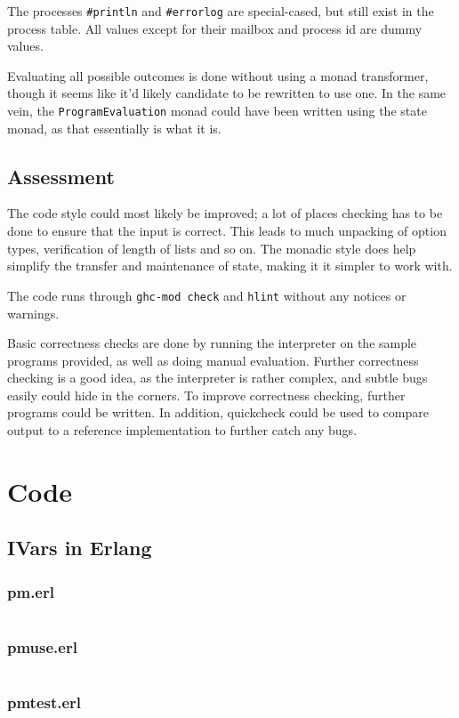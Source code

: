 \documentclass[11pt,a4paper]{article}
\begin{document}
The processes \texttt{\#println} and \texttt{\#errorlog} are special-cased,
but still exist in the process table. All values except for their mailbox and
process id are dummy values.

Evaluating all possible outcomes is done without using a monad transformer,
though it seems like it'd likely candidate to be rewritten to use one. In the
same vein, the \texttt{ProgramEvaluation} monad could have been written using
the state monad, as that essentially is what it is.

\subsection{Assessment}
The code style could most likely be improved; a lot of places checking has to
be done to ensure that the input is correct. This leads to much unpacking of
option types, verification of length of lists and so on. The monadic style
does help simplify the transfer and maintenance of state, making it it simpler
to work with.

The code runs through \texttt{ghc-mod check} and \texttt{hlint} without any
notices or warnings.

Basic correctness checks are done by running the interpreter on the sample
programs provided, as well as doing manual evaluation. Further correctness
checking is a good idea, as the interpreter is rather complex, and subtle bugs
easily could hide in the corners. To improve correctness checking, further
programs could be written. In addition, quickcheck could be used to compare
output to a reference implementation to further catch any bugs.

\appendix
\section{Code}
\subsection{IVars in Erlang}
\subsubsection{pm.erl}
\inputminted{erlang}{src/pm/pm.erl}
\subsubsection{pmuse.erl}
\inputminted{erlang}{src/pm/pmuse.erl}
\subsubsection{pmtest.erl}
\inputminted{erlang}{src/pm/pmtest.erl}
\end{document}
